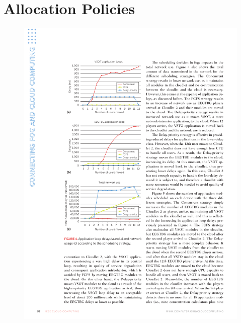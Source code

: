 \documentclass[10pt, pdf, xcolor=pdftex, dvipsnames, table]{beamer}
\begin{document}
\begin{frame}

\end{frame}

\begin{frame}

\end{frame}

\section[Allocation Policies]{Allocation Policies}

\begin{frame}
	\tableofcontents[currentsection]
\end{frame}

\begin{frame}
\end{frame}

\begin{frame}
 	\begin{figure}[htbp]
 		\centerline{\includegraphics[scale=1.2]{images/4a.pdf}}
 		\caption[]{}
 	\end{figure}
\end{frame}
\end{document}
